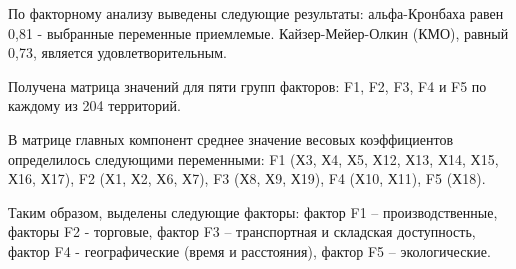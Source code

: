 
По факторному анализу выведены следующие результаты: альфа-Кронбаха
равен 0,81 - выбранные переменные приемлемые. Кайзер-Мейер-Олкин (КМО),
равный 0,73, является удовлетворительным.

Получена матрица значений для пяти групп факторов: F1, F2, F3, F4 и F5
по каждому из 204 территорий.

В матрице главных компонент среднее значение весовых коэффициентов
определилось следующими переменными: F1 (Х3, Х4, Х5, Х12, Х13, Х14, Х15,
Х16, Х17), F2 (Х1, Х2, Х6, Х7), F3 (Х8, Х9, Х19), F4 (Х10, Х11), F5
(Х18).

Таким образом, выделены следующие факторы: фактор F1 --
производственные, факторы F2 - торговые, фактор F3 -- транспортная и
складская доступность, фактор F4 - географические (время и расстояния),
фактор F5 -- экологические.

